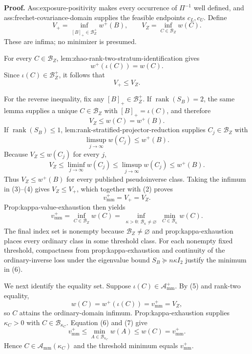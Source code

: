 \textbf{Proof.}
Ass:exposure-positivity makes every occurrence of \(\Pi^{-1}\) well defined, and ass:frechet-covariance-domain supplies the feasible endpoints \(c_L,c_U\).  Define
\[
V_+=\inf_{[B]_+\in\mathcal B_Z^+}w^+(B),
\qquad
V_Z=\inf_{C\in\mathcal B_Z}w(C).                                  \tag{1}
\]
These are infima; no minimizer is presumed.

For every \(C\in\mathcal B_Z\), lem:zhao-rank-two-stratum-identification gives
\[
w^+(\iota(C))=w(C).
\]
Since \(\iota(C)\in\mathcal B_Z^+\), it follows that
\[
V_+\le V_Z.                                                        \tag{2}
\]

For the reverse inequality, fix any \([B]_+\in\mathcal B_Z^+\).  If \(\operatorname{rank}(S_B)=2\), the same lemma supplies a unique \(C\in\mathcal B_Z\) with \([B]_+=\iota(C)\), and therefore
\[
V_Z\le w(C)=w^+(B).                                                \tag{3}
\]
If \(\operatorname{rank}(S_B)\le1\), lem:rank-stratified-projector-reduction supplies \(C_j\in\mathcal B_Z\) with
\[
\limsup_{j\to\infty}w(C_j)\le w^+(B).
\]
Because \(V_Z\le w(C_j)\) for every \(j\),
\[
V_Z\le\liminf_{j\to\infty}w(C_j)
\le\limsup_{j\to\infty}w(C_j)
\le w^+(B).                                                        \tag{4}
\]
Thus \(V_Z\le w^+(B)\) for every published pseudoinverse class.  Taking the infimum in (3)--(4) gives \(V_Z\le V_+\), which together with (2) proves
\[
v_{\mathrm{mm}}^+=V_+=V_Z.                                       \tag{5}
\]
Prop:kappa-value-exhaustion then yields
\[
v_{\mathrm{mm}}^+
=\inf_{C\in\mathcal B_Z}w(C)
=\inf_{\substack{\kappa>0:\,\mathcal B_\kappa\ne\varnothing}}
\min_{C\in\mathcal B_\kappa}w(C).                               \tag{6}
\]
The final index set is nonempty because \(\mathcal B_Z\ne\varnothing\) and prop:kappa-exhaustion places every ordinary class in some threshold class.  For each nonempty fixed threshold, compactness from prop:kappa-exhaustion and continuity of the ordinary-inverse loss under the eigenvalue bound \(S_B\succeq n\kappa I_2\) justify the minimum in (6).

We next identify the equality set.  Suppose \(\iota(C)\in\mathcal A_{\mathrm{mm}}^+\).  By (5) and rank-two equality,
\[
w(C)=w^+(\iota(C))=v_{\mathrm{mm}}^+=V_Z,                          \tag{7}
\]
so \(C\) attains the ordinary-domain infimum.  Prop:kappa-exhaustion supplies \(\kappa_C>0\) with \(C\in\mathcal B_{\kappa_C}\).  Equation (6) and (7) give
\[
v_{\mathrm{mm}}^+
\le\min_{A\in\mathcal B_{\kappa_C}}w(A)
\le w(C)=v_{\mathrm{mm}}^+.
\]
Hence \(C\in\mathcal A_{\mathrm{mm}}(\kappa_C)\) and the threshold minimum equals \(v_{\mathrm{mm}}^+\).

